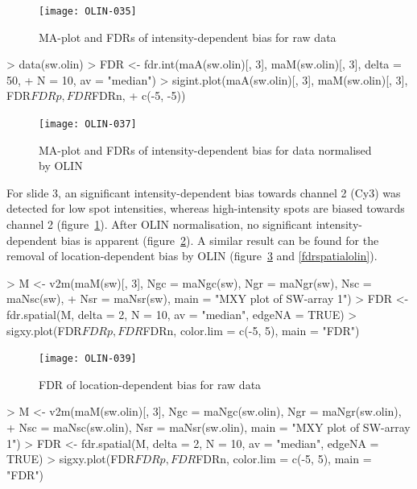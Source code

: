 \documentclass[a4paper,11pt]{article}
\begin{document}
\begin{figure}[t]
\centering
\texttt{[image: OLIN-035]}
\caption{MA-plot and FDRs of  intensity-dependent bias for raw data }
\label{fdrintraw}
\end{figure}



\begin{Schunk}
\begin{Sinput}
> data(sw.olin)
> FDR <- fdr.int(maA(sw.olin)[, 3], maM(sw.olin)[, 3], delta = 50, 
+     N = 10, av = "median")
> sigint.plot(maA(sw.olin)[, 3], maM(sw.olin)[, 3], FDR$FDRp, FDR$FDRn, 
+     c(-5, -5))
\end{Sinput}
\end{Schunk}



\begin{figure}
\centering
\texttt{[image: OLIN-037]}
\caption{MA-plot and FDRs of  intensity-dependent bias for data normalised by OLIN }
\label{fdrintolin}
\end{figure}

For slide 3, an significant intensity-dependent bias towards channel 2 (Cy3)
was detected for low spot intensities, whereas high-intensity spots are biased
towards channel 2 (figure~\ref{fdrintraw}). After OLIN normalisation, no significant intensity-dependent
bias is apparent (figure~\ref{fdrintolin}). A similar result can be found for the 
removal of location-dependent bias by OLIN (figure~\ref{fdrspatialraw} and \ref{fdrspatialolin}).


\begin{Schunk}
\begin{Sinput}
> M <- v2m(maM(sw)[, 3], Ngc = maNgc(sw), Ngr = maNgr(sw), Nsc = maNsc(sw), 
+     Nsr = maNsr(sw), main = "MXY plot of SW-array 1")
> FDR <- fdr.spatial(M, delta = 2, N = 10, av = "median", edgeNA = TRUE)
> sigxy.plot(FDR$FDRp, FDR$FDRn, color.lim = c(-5, 5), main = "FDR")
\end{Sinput}
\end{Schunk}




\begin{figure}[t]
\centering
\texttt{[image: OLIN-039]}
\caption{FDR of location-dependent bias for raw data }
\label{fdrspatialraw}
\end{figure}


\begin{Schunk}
\begin{Sinput}
> M <- v2m(maM(sw.olin)[, 3], Ngc = maNgc(sw.olin), Ngr = maNgr(sw.olin), 
+     Nsc = maNsc(sw.olin), Nsr = maNsr(sw.olin), main = "MXY plot of SW-array 1")
> FDR <- fdr.spatial(M, delta = 2, N = 10, av = "median", edgeNA = TRUE)
> sigxy.plot(FDR$FDRp, FDR$FDRn, color.lim = c(-5, 5), main = "FDR")
\end{Sinput}
\end{Schunk}
\end{document}
